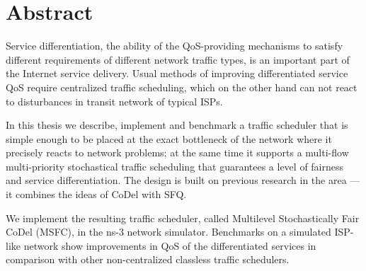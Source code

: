 \documentclass[12pt,a4paper]{report}
\title{}
\author{}
\begin{document}
	\pagestyle{empty}
\section*{Abstract}
Service differentiation, the ability of the QoS-providing mechanisms to satisfy different requirements of different network traffic types, is an important part of the Internet service delivery. Usual methods of improving differentiated service QoS require centralized traffic scheduling, which on the other hand can not react to disturbances in transit network of typical ISPs.

In this thesis we describe, implement and benchmark a traffic scheduler that is simple enough to be placed at the
exact bottleneck of the network where it precisely reacts to network problems; at the same time it
supports a multi-flow multi-priority stochastical traffic scheduling that guarantees a level of fairness and service differentiation. The design is built on previous research in the area --- it combines the ideas of CoDel with SFQ.  

We implement the resulting traffic scheduler, called Multilevel Stochastically Fair CoDel (MSFC), in the ns-3 network simulator. Benchmarks on a simulated ISP-like network show improvements in QoS of the differentiated services in comparison with other non-centralized classless traffic schedulers.
\end{document}

